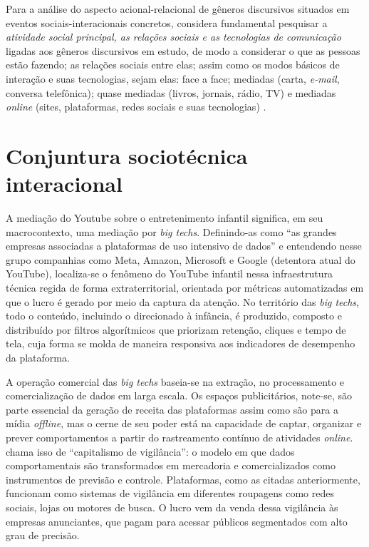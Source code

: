 \documentclass[portuguese]{textolivre}
\begin{document}
Para a análise do aspecto acional-relacional de gêneros discursivos situados em eventos sociais-interacionais concretos, \textcite[p. 70]{Fairclough2003AnalysingDiscourse} considera fundamental pesquisar a \textit{atividade social principal, as relações sociais e as tecnologias de comunicação} ligadas aos gêneros discursivos em estudo, de modo a considerar o que as pessoas estão fazendo; as relações sociais entre elas; assim como os modos básicos de interação e suas tecnologias, sejam elas: face a face; mediadas (carta, \textit{e-mail}, conversa telefônica); quase mediadas (livros, jornais, rádio, TV) e mediadas \textit{online} (sites, plataformas, redes sociais e suas tecnologias) \cite{Thompson2018InteracaoMediada}.

\section{Conjuntura sociotécnica interacional}\label{sec-normas}
A mediação do Youtube sobre o entretenimento infantil significa, em seu macrocontexto, uma mediação por \textit{big techs}. Definindo-as como “as grandes empresas associadas a plataformas de uso intensivo de dados” \cite[p. 148]{Morozov2018BigTech} e entendendo nesse grupo companhias como Meta, Amazon, Microsoft e Google (detentora atual do YouTube), localiza-se o fenômeno do YouTube infantil nessa infraestrutura técnica regida de forma extraterritorial, orientada por métricas automatizadas em que o lucro é gerado por meio da captura da atenção. No território das \textit{big techs}, todo o conteúdo, incluindo o direcionado à infância, é produzido, composto e distribuído por filtros algorítmicos que priorizam retenção, cliques e tempo de tela, cuja forma se molda de maneira responsiva aos indicadores de desempenho da plataforma.

A operação comercial das \textit{big techs} baseia-se na extração, no processamento e comercialização de dados em larga escala. Os espaços publicitários, note-se, são parte essencial da geração de receita das plataformas assim como são para a mídia \textit{offline}, mas o cerne de seu poder está na capacidade de captar, organizar e prever comportamentos a partir do rastreamento contínuo de atividades \textit{online}. \textcite{Zuboff2019SurveillanceCapitalism} chama isso de “capitalismo de vigilância”: o modelo em que dados comportamentais são transformados em mercadoria e comercializados como instrumentos de previsão e controle. Plataformas, como as citadas anteriormente, funcionam como sistemas de vigilância em diferentes roupagens como redes sociais, lojas ou motores de busca. O lucro vem da venda dessa vigilância às empresas anunciantes, que pagam para acessar públicos segmentados com alto grau de precisão.
\end{document}
